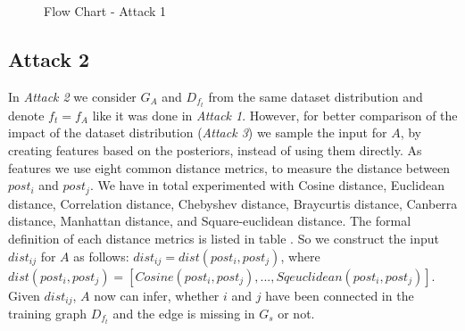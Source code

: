       \vspace{0.48cm}
      \begin{figure}[h!]
        \caption{Flow Chart - Attack 1}
        \label{figure:flow-chart-attack-1}
      \end{figure}

    \subsection*{Attack 2}
    \label{section:attack2}
      In \emph{Attack 2} we consider $G_A$ and $D_{f_t}$ from the same dataset distribution and denote $f_t = f_A$ like it was done in \emph{Attack 1}.
      However, for better comparison of the impact of the dataset distribution (\emph{Attack 3}) we sample the input for $A$, by creating features based on the posteriors, instead of using them directly.
      As features we use eight common distance metrics, to measure the distance between $post_i$ and $post_j$.
      We have in total experimented with Cosine distance, Euclidean distance, Correlation distance, Chebyshev distance, Braycurtis distance, Canberra distance, Manhattan distance, and Square-euclidean distance.
      The formal definition of each distance metrics is listed in table .
      So we construct the input $dist_{ij}$ for $A$ as follows: $dist_{ij} = dist(post_i, post_j)$, where $dist(post_i, post_j) = [Cosine(post_i,post_j), ..., Sqeuclidean(post_i,post_j)]$.
      Given $dist_{ij}$, $A$ now can infer, whether $i$ and $j$ have been connected in the training graph $D_{f_t}$ and the edge is missing in $G_s$ or not.

